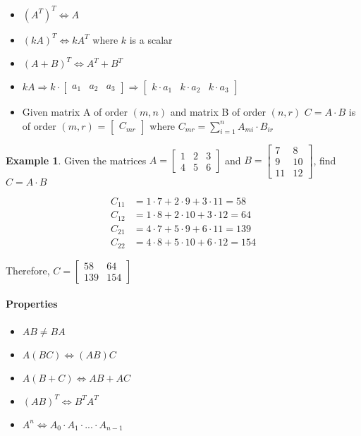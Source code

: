 \documentclass{article}
\theoremstyle{definition}
\newtheorem{example}[theorem]{Example}
\theoremstyle{remark}
\begin{document}
\begin{itemize}
    \item $(A^T)^T \Leftrightarrow A$
    \item $(kA)^T \Leftrightarrow kA^T$ where $k$ is a scalar
    \item $(A + B)^T \Leftrightarrow A^T + B^T$
    \item $kA \Rightarrow k \cdot \begin{bmatrix}
        a_1 & a_2 & a_3
    \end{bmatrix} \Rightarrow \begin{bmatrix}
        k \cdot a_1 & k \cdot a_2 & k \cdot a_3
    \end{bmatrix}$
    \item Given matrix A of order $(m,n)$ and matrix B of order $(n,r)$
    \subitem $C = A \cdot B$ is of order $(m,r)$ = $\begin{bmatrix}
        C_{mr}
    \end{bmatrix}$ where $C_{mr} = \sum_{i=1}^{n} A_{mi} \cdot B_{ir}$
\end{itemize}

\begin{example}
    Given the matrices $A = \begin{bmatrix}
        1 & 2 & 3 \\
        4 & 5 & 6
    \end{bmatrix}$ and $B = \begin{bmatrix}
        7 & 8 \\
        9 & 10 \\
        11 & 12
    \end{bmatrix}$, find $C = A \cdot B$

    \begin{align*}
        C_{11} &= 1 \cdot 7 + 2 \cdot 9 + 3 \cdot 11 = 58 \\
        C_{12} &= 1 \cdot 8 + 2 \cdot 10 + 3 \cdot 12 = 64 \\
        C_{21} &= 4 \cdot 7 + 5 \cdot 9 + 6 \cdot 11 = 139 \\
        C_{22} &= 4 \cdot 8 + 5 \cdot 10 + 6 \cdot 12 = 154
    \end{align*}

    Therefore, $C = \begin{bmatrix}
        58 & 64 \\
        139 & 154
    \end{bmatrix}$
\end{example}

\paragraph{Properties}
\begin{itemize}
    \item $AB \neq BA$
    \item $A(BC) \Leftrightarrow (AB)C$
    \item $A(B + C) \Leftrightarrow AB + AC$ 
    \item $(AB)^T \Leftrightarrow B^TA^T$
    \item $A^n \Leftrightarrow A_0 \cdot A_1 \cdot ... \cdot A_{n-1}$
\end{itemize}
\end{document}
